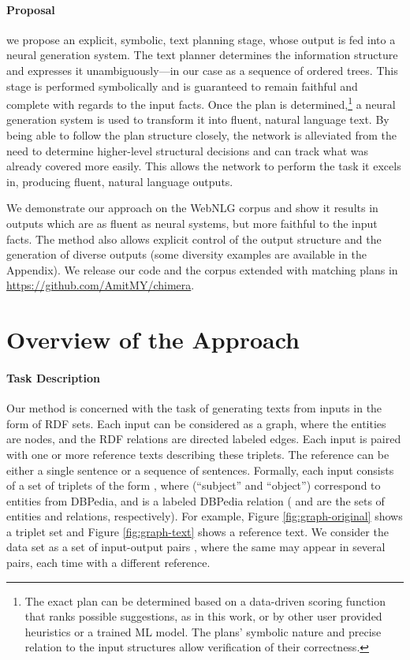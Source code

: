\documentclass[11pt,a4paper]{article}
\begin{document}
\paragraph{Proposal} we propose an explicit, symbolic, text planning stage, whose output is fed into a neural generation system. The text planner determines the information structure and expresses it unambiguously---in our case as a sequence of ordered trees. This stage is performed symbolically and is guaranteed to remain faithful and complete with regards to the input facts. Once the plan is determined,\footnote{The exact plan can be determined based on a data-driven scoring function that ranks possible suggestions, as in this work, or by other user provided heuristics or a trained ML model. The plans' symbolic nature and precise relation to the input structures allow verification of their correctness.} a neural generation system is used to transform it into fluent, natural language text. By being able to follow the plan structure closely, the network is alleviated from the need to determine higher-level structural decisions and can track what was already covered more easily. This allows the network to perform the task it excels in, producing fluent, natural language outputs.

We demonstrate our approach on the WebNLG corpus and show it results in outputs which are as fluent as neural systems, but more faithful to the input facts. 
The method also allows explicit control of the output structure and the generation of diverse outputs (some diversity examples are available in the Appendix).
We release our code and the corpus extended with matching plans in \url{https://github.com/AmitMY/chimera}.

\section{Overview of the Approach}\label{sec:preliminaries}
\paragraph{Task Description}
Our method is concerned with the task of generating texts from inputs in the form of RDF sets. Each input can be considered as a graph, where the entities are nodes, and the RDF relations are directed labeled edges. 
Each input is paired with one or more reference texts describing these triplets. The reference can be either a single sentence or a sequence of sentences. 
Formally, each input  consists of a set of triplets of the form , where  (``subject'' and ``object'') correspond to entities from DBPedia, and  is a labeled DBPedia relation ( and  are the sets of entities and relations, respectively). 
For example, Figure \ref{fig:graph-original} shows a triplet set  and Figure \ref{fig:graph-text} shows a reference text.
We consider the data set as a set of input-output pairs , where the same  may appear in several pairs, each time with a different reference.
\end{document}
